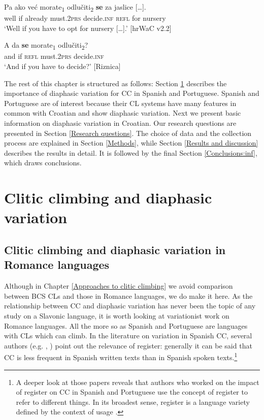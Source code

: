 \begin{exe}\ex\label{(15.1)}
\gll Pa ako već morate\textsubscript{1} odlučiti\textsubscript{2} \textbf{se} za  {jaslice [\dots].} \\
well if already must.\textsc{2prs} decide.\textsc{inf} \textsc{refl} for nursery \\
\glt ‘Well if you have to opt for nursery [\dots].’
\hfill [hrWaC v2.2]

\ex\label{(15.2)}
\gll A da \textbf{se} morate\textsubscript{1} odlučiti\textsubscript{2}? \\
and if \textsc{refl} must.\textsc{2prs} decide.\textsc{inf} \\
\glt ‘And if you have to decide?’
\hfill [Riznica]
\end{exe}

\noindent The rest of this chapter is structured as follows: Section \ref{Clitic climbing and diaphasic variation} describes the importance of diaphasic variation for CC in Spanish and Portuguese. Spanish and Portuguese are of interest because their CL systems have many features in common with Croatian and show diaphasic variation. Next we present basic information on diaphasic variation in Croatian. Our research questions are presented in Section \ref{Research questions}. The choice of data and the collection process are explained in Section \ref{Methods}, while Section \ref{Results and discussion} describes the results in detail. It is followed by the final Section \ref{Conclusions:inf}, which draws conclusions.

\section{Clitic climbing and diaphasic variation}
\label{Clitic climbing and diaphasic variation}
\subsection{Clitic climbing and diaphasic variation in Romance languages}

Although in Chapter \ref{Approaches to clitic climbing} we avoid comparison between BCS CLs and those in Romance languages, we do make it here. As the relationship between CC and diaphasic variation has never been the topic of any study on a Slavonic language, it is worth looking at variationist work on Romance languages. All the more so as Spanish and Portuguese are languages with CLs which can climb. In the literature on variation in Spanish CC, several authors (e.g. \citealt{Davies95}, \citealt{Cacoullos99}) point out the relevance of register: generally it can be said that CC is less frequent in Spanish written texts than in Spanish spoken texts.\footnote{A deeper look at those papers reveals that authors who worked on the impact of register on CC in Spanish and Portuguese use the concept of register to refer to different things. In its broadest sense, register is a language variety defined by the context of usage \citep[31]{Colak15}.} 

